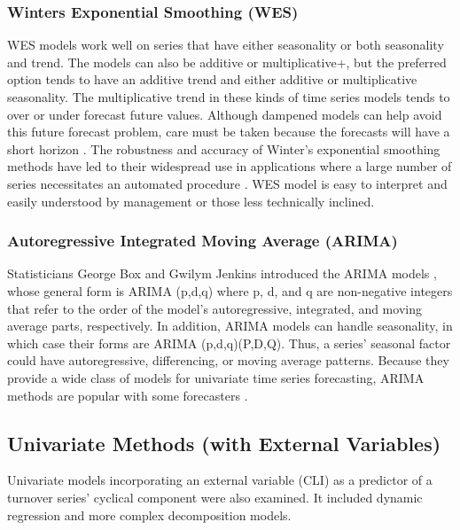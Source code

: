 \subsubsection{Winters Exponential Smoothing (WES)}
WES models work well on series that have either seasonality or both seasonality and trend.  The models can also be additive or multiplicative+, but the preferred option tends to have an additive trend and either additive or multiplicative seasonality.  The multiplicative trend in these kinds of time series models tends to over or under forecast future values. Although dampened models can help avoid this future forecast problem, care must be taken because the forecasts will have a short horizon \citep{de1998}. The robustness and accuracy of Winter's exponential smoothing methods have led to their widespread use in applications where a large number of series necessitates an automated procedure \citep{win1960,tay2003}. WES model is easy to interpret and easily understood by management or those less technically inclined. 
\subsubsection{Autoregressive Integrated Moving Average (ARIMA)}
Statisticians George Box and Gwilym Jenkins introduced the ARIMA models \citep{box1970}, whose general form is ARIMA (p,d,q) where p, d, and q are non-negative integers that refer to the order of the model's autoregressive, integrated, and moving average parts,  respectively. In addition, ARIMA models can handle seasonality, in which case their forms are ARIMA (p,d,q)(P,D,Q). Thus, a series' seasonal factor could have autoregressive, differencing, or moving average patterns.  Because they provide a wide class of models for univariate time series forecasting, ARIMA methods are popular with some forecasters \citep{har1983}.  

\subsection{Univariate Methods (with External Variables)}
Univariate models incorporating an external variable (CLI) as a predictor of a turnover series' cyclical component were also examined. It included dynamic regression and more complex decomposition models.

